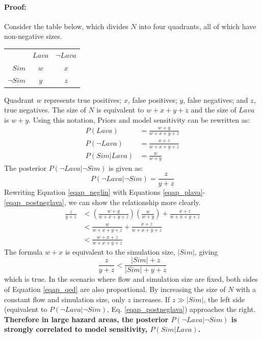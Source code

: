 \documentclass[12pt,letter]{article}
\begin{document}
\paragraph{Proof:} Consider the table below, which divides $N$ into four quadrants, all of which have non-negative sizes.
\begin{center}
\begin{tabular}{ r | c | c |}
	\multicolumn{1}{l}{}&\multicolumn{1}{p{3em}}{\centering$Lava$} &\multicolumn{1}{p{3em}}{$\neg Lava$}\\ \cline{2-3}
	$Sim$ & $w$ & $x$ \\ \cline{2-3}
	$\neg Sim$ & $y$ & $z$ \\ \cline{2-3}
\end{tabular}
\end{center}
Quadrant $w$ represents true positives; $x$, false positives; $y$, false negatives; and $z$, true negatives. The size of $N$ is equivalent to $w+x+y+z$ and the size of $Lava$ is $w+y$. Using this notation, Priors and model sensitivity can be rewritten as:
\begin{align}
P(Lava) &= \frac{w+y}{w+x+y+z}\label{eqap_plava}\\
P(\neg Lava) &= \frac{x+z}{w+x+y+z}\\
P(Sim|Lava) &= \frac{w}{w+y}
\end{align}
The posterior $P(\neg Lava|\neg Sim)$ is given as:
\begin{equation}
P(\neg Lava|\neg Sim)=\frac{z}{y+z}
\label{eqap_postneglava}
\end{equation}
Rewriting Equation \ref{eqap_neglin} with Equations \ref{eqap_plava}-\ref{eqap_postneglava}, we can show the relationship more clearly.
\begin{align}
\frac{z}{y+z}&<\left(\frac{w+y}{w+x+y+z}\right)\left(\frac{w}{w+y}\right)+\frac{x+z}{w+x+y+z}\\
&<\frac{w}{w+x+y+z}+\frac{x+z}{w+x+y+z}\nonumber\\
&<\frac{w+x+z}{w+x+y+z}\nonumber
\end{align}
The formula $w+x$ is equivalent to the simulation size, $|Sim|$, giving
\begin{equation}
\frac{z}{y+z}<\frac{|Sim|+z}{|Sim|+y+z}
\label{eqap_qed}
\end{equation}
which is true. In the scenario where flow and simulation size are fixed, both sides of Equation \ref{eqap_qed} are also proportional. By increasing the size of $N$ with a constant flow and simulation size, only $z$ increases. If $z\gg|Sim|$, the left side (equivalent to $P(\neg Lava|\neg Sim)$, Eq. \ref{eqap_postneglava}) approaches the right. \textbf{Therefore in large hazard areas, the posterior $P(\neg Lava|\neg Sim)$ is strongly correlated to model sensitivity, $P(Sim|Lava)$.}


\end{document}

